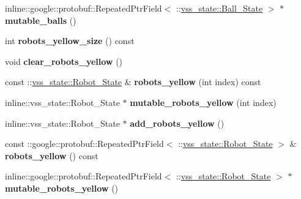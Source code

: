 \begin{DoxyCompactItemize}
\item 
inline\+::google\+::protobuf\+::\+Repeated\+Ptr\+Field$<$ \+::\hyperlink{classvss__state_1_1Ball__State}{vss\+\_\+state\+::\+Ball\+\_\+\+State} $>$ $\ast$ {\bfseries mutable\+\_\+balls} ()\hypertarget{classvss__state_1_1Global__State_a47fa3f079e92555b8d86ef916def763e}{}\label{classvss__state_1_1Global__State_a47fa3f079e92555b8d86ef916def763e}

\item 
int {\bfseries robots\+\_\+yellow\+\_\+size} () const \hypertarget{classvss__state_1_1Global__State_ad9605aa1df1cc1a30adc6a88bd85f34f}{}\label{classvss__state_1_1Global__State_ad9605aa1df1cc1a30adc6a88bd85f34f}

\item 
void {\bfseries clear\+\_\+robots\+\_\+yellow} ()\hypertarget{classvss__state_1_1Global__State_a5519565ece84f3f429aa692217fff1f6}{}\label{classvss__state_1_1Global__State_a5519565ece84f3f429aa692217fff1f6}

\item 
const \+::\hyperlink{classvss__state_1_1Robot__State}{vss\+\_\+state\+::\+Robot\+\_\+\+State} \& {\bfseries robots\+\_\+yellow} (int index) const \hypertarget{classvss__state_1_1Global__State_a311a39a8f7be0721ebb684b9bc286ce2}{}\label{classvss__state_1_1Global__State_a311a39a8f7be0721ebb684b9bc286ce2}

\item 
inline\+::vss\+\_\+state\+::\+Robot\+\_\+\+State $\ast$ {\bfseries mutable\+\_\+robots\+\_\+yellow} (int index)\hypertarget{classvss__state_1_1Global__State_a040f90d8bad2e783b1e91077a7c79234}{}\label{classvss__state_1_1Global__State_a040f90d8bad2e783b1e91077a7c79234}

\item 
inline\+::vss\+\_\+state\+::\+Robot\+\_\+\+State $\ast$ {\bfseries add\+\_\+robots\+\_\+yellow} ()\hypertarget{classvss__state_1_1Global__State_aecf340a8be8a26db65bd29ebafcbf1d6}{}\label{classvss__state_1_1Global__State_aecf340a8be8a26db65bd29ebafcbf1d6}

\item 
const \+::google\+::protobuf\+::\+Repeated\+Ptr\+Field$<$ \+::\hyperlink{classvss__state_1_1Robot__State}{vss\+\_\+state\+::\+Robot\+\_\+\+State} $>$ \& {\bfseries robots\+\_\+yellow} () const \hypertarget{classvss__state_1_1Global__State_ad18fe89214728e2c808c8911575ab90b}{}\label{classvss__state_1_1Global__State_ad18fe89214728e2c808c8911575ab90b}

\item 
inline\+::google\+::protobuf\+::\+Repeated\+Ptr\+Field$<$ \+::\hyperlink{classvss__state_1_1Robot__State}{vss\+\_\+state\+::\+Robot\+\_\+\+State} $>$ $\ast$ {\bfseries mutable\+\_\+robots\+\_\+yellow} ()\hypertarget{classvss__state_1_1Global__State_a533514002331b04a673326f334a3e5ce}{}\label{classvss__state_1_1Global__State_a533514002331b04a673326f334a3e5ce}


\end{DoxyCompactItemize}
